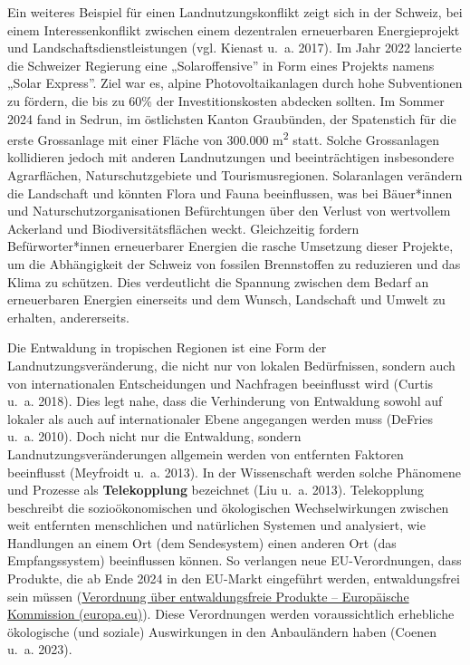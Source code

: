 \documentclass[
  nswissgerman,
  a4paper,
  openany]{book}
\begin{document}
\begin{tcolorbox}[enhanced jigsaw, arc=.35mm, bottomrule=.15mm, bottomtitle=1mm, breakable, colback=white, colbacktitle=quarto-callout-tip-color!10!white, colframe=quarto-callout-tip-color-frame, coltitle=black, left=2mm, leftrule=.75mm, opacityback=0, opacitybacktitle=0.6, rightrule=.15mm, title={Landnutzungskonflikte in der Schweiz: der Solar Express}, titlerule=0mm, toprule=.15mm, toptitle=1mm]

Ein weiteres Beispiel für einen Landnutzungskonflikt zeigt sich in der
Schweiz, bei einem Interessenkonflikt zwischen einem dezentralen
erneuerbaren Energieprojekt und Landschaftsdienstleistungen (vgl.
Kienast u.~a. 2017). Im Jahr 2022 lancierte die Schweizer Regierung eine
„Solaroffensive'' in Form eines Projekts namens „Solar Express''. Ziel
war es, alpine Photovoltaikanlagen durch hohe Subventionen zu fördern,
die bis zu 60\% der Investitionskosten abdecken sollten. Im Sommer 2024
fand in Sedrun, im östlichsten Kanton Graubünden, der Spatenstich für
die erste Grossanlage mit einer Fläche von 300.000 m\textsuperscript{2}
statt. Solche Grossanlagen kollidieren jedoch mit anderen Landnutzungen
und beeinträchtigen insbesondere Agrarflächen, Naturschutzgebiete und
Tourismusregionen. Solaranlagen verändern die Landschaft und könnten
Flora und Fauna beeinflussen, was bei Bäuer*innen und
Naturschutzorganisationen Befürchtungen über den Verlust von wertvollem
Ackerland und Biodiversitätsflächen weckt. Gleichzeitig fordern
Befürworter*innen erneuerbarer Energien die rasche Umsetzung dieser
Projekte, um die Abhängigkeit der Schweiz von fossilen Brennstoffen zu
reduzieren und das Klima zu schützen. Dies verdeutlicht die Spannung
zwischen dem Bedarf an erneuerbaren Energien einerseits und dem Wunsch,
Landschaft und Umwelt zu erhalten, andererseits.

\end{tcolorbox}

Die Entwaldung in tropischen Regionen ist eine Form der
Landnutzungsveränderung, die nicht nur von lokalen Bedürfnissen, sondern
auch von internationalen Entscheidungen und Nachfragen beeinflusst wird
(Curtis u.~a. 2018). Dies legt nahe, dass die Verhinderung von
Entwaldung sowohl auf lokaler als auch auf internationaler Ebene
angegangen werden muss (DeFries u.~a. 2010). Doch nicht nur die
Entwaldung, sondern Landnutzungsveränderungen allgemein werden von
entfernten Faktoren beeinflusst (Meyfroidt u.~a. 2013). In der
Wissenschaft werden solche Phänomene und Prozesse als
\textbf{Telekopplung} bezeichnet ({Liu u.~a.} 2013). Telekopplung
beschreibt die sozioökonomischen und ökologischen Wechselwirkungen
zwischen weit entfernten menschlichen und natürlichen Systemen und
analysiert, wie Handlungen an einem Ort (dem Sendesystem) einen anderen
Ort (das Empfangssystem) beeinflussen können. So verlangen neue
EU-Verordnungen, dass Produkte, die ab Ende 2024 in den EU-Markt
eingeführt werden, entwaldungsfrei sein müssen
(\href{https://environment.ec.europa.eu/topics/forests/deforestation/regulation-deforestation-free-products_en}{Verordnung
über entwaldungsfreie Produkte -- Europäische Kommission (europa.eu)}).
Diese Verordnungen werden voraussichtlich erhebliche ökologische (und
soziale) Auswirkungen in den Anbauländern haben (Coenen u.~a. 2023).
\end{document}
